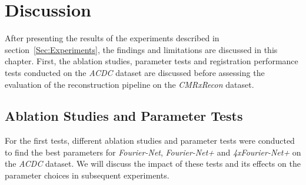 
\chapter{Discussion} \label{Ch:Discussion}
After presenting the results of the experiments described in section~\ref{Sec:Experiments}, the findings and limitations are discussed in this chapter. First, the ablation studies, parameter tests and registration performance tests conducted on the \emph{ACDC} dataset are discussed before assessing the evaluation of the reconstruction pipeline on the \emph{CMRxRecon} dataset.

\section{Ablation Studies and Parameter Tests} \label{Sec:DiscussionParameterTestsACDC}
For the first tests, different ablation studies and parameter tests were conducted to find the best parameters for \emph{Fourier-Net}, \emph{Fourier-Net+} and \emph{4xFourier-Net+} on the \emph{ACDC} dataset. We will discuss the impact of these tests and its effects on the parameter choices in subsequent experiments.

